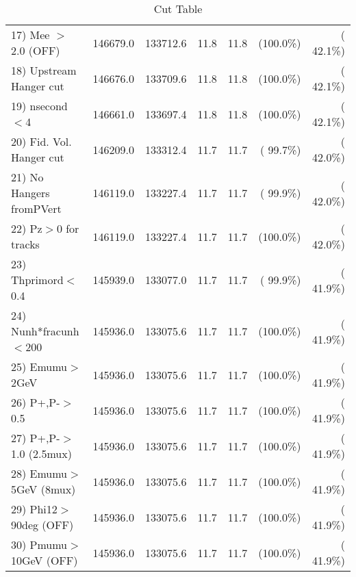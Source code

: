\begin{table}[h!]
\begin{tabular}{||l||r|r|r|r|r|r||}
 17) Mee $>$ 2.0  (OFF)   &     146679.0 &     133712.6 &         11.8 &         11.8 & (100.0\%) & ( 42.1\%) \\
 18) Upstream Hanger cut  &     146676.0 &     133709.6 &         11.8 &         11.8 & (100.0\%) & ( 42.1\%) \\
 19) nsecond$<$4          &     146661.0 &     133697.4 &         11.8 &         11.8 & (100.0\%) & ( 42.1\%) \\
 20) Fid. Vol. Hanger cut &     146209.0 &     133312.4 &         11.7 &         11.7 & ( 99.7\%) & ( 42.0\%) \\
 21) No Hangers fromPVert &     146119.0 &     133227.4 &         11.7 &         11.7 & ( 99.9\%) & ( 42.0\%) \\
 22) Pz$>$0 for tracks    &     146119.0 &     133227.4 &         11.7 &         11.7 & (100.0\%) & ( 42.0\%) \\
 23) Thprimord$<$0.4      &     145939.0 &     133077.0 &         11.7 &         11.7 & ( 99.9\%) & ( 41.9\%) \\
 24) Nunh*fracunh$<$200   &     145936.0 &     133075.6 &         11.7 &         11.7 & (100.0\%) & ( 41.9\%) \\
 25) Emumu$>$2GeV         &     145936.0 &     133075.6 &         11.7 &         11.7 & (100.0\%) & ( 41.9\%) \\
 26) P+,P-$>$0.5          &     145936.0 &     133075.6 &         11.7 &         11.7 & (100.0\%) & ( 41.9\%) \\
 27) P+,P-$>$1.0 (2.5mux) &     145936.0 &     133075.6 &         11.7 &         11.7 & (100.0\%) & ( 41.9\%) \\
 28) Emumu$>$5GeV  (8mux) &     145936.0 &     133075.6 &         11.7 &         11.7 & (100.0\%) & ( 41.9\%) \\
 29) Phi12$>$90deg  (OFF) &     145936.0 &     133075.6 &         11.7 &         11.7 & (100.0\%) & ( 41.9\%) \\
 30) Pmumu$>$10GeV  (OFF) &     145936.0 &     133075.6 &         11.7 &         11.7 & (100.0\%) & ( 41.9\%) \\
 \hline
 \hline
 \end{tabular}
 \caption{Cut Table           }
 \label{tab-cutcohjpsi-mumu_jpsi}
 \end{table}
